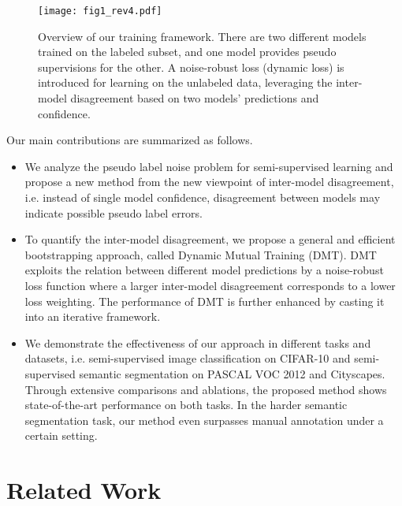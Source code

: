 \documentclass[preprint,review,10pt]{elsarticle}
\begin{document}
\begin{figure}[t]
\centering
\texttt{[image: fig1\_rev4.pdf]}
\caption{Overview of our training framework. There are two different models trained on the labeled subset, and one model provides pseudo supervisions for the other. A noise-robust loss (dynamic loss) is introduced for learning on the unlabeled data, leveraging the inter-model disagreement based on two models' predictions and confidence. }
\label{fig1}
\end{figure}




Our main contributions are summarized as follows.
\begin{itemize}
    \item We analyze the pseudo label noise problem for semi-supervised learning and propose a new method from the new viewpoint of inter-model disagreement, i.e. instead of single model confidence, disagreement between models may indicate possible pseudo label errors.
    \item To quantify the inter-model disagreement, we propose a general and efficient bootstrapping approach, called Dynamic Mutual Training (DMT). DMT exploits the relation between different model predictions by a noise-robust loss function where a larger inter-model disagreement corresponds to a lower loss weighting. The performance of DMT is further enhanced by casting it into an iterative framework.
    \item We demonstrate the effectiveness of our approach in different tasks and datasets, i.e. semi-supervised image classification on CIFAR-10 and semi-supervised semantic segmentation on PASCAL VOC 2012 and Cityscapes. Through extensive comparisons and ablations, the proposed method shows state-of-the-art performance on both tasks. In the harder semantic segmentation task, our method even surpasses manual annotation under a certain setting.
\end{itemize}



\section{Related Work}
\label{sec:6}
\end{document}
